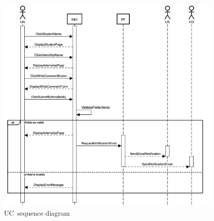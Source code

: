 \begin{figure}[h]
    \centering
    \includegraphics[width=16cm]{images/sequence-diagrams/university-comments-internship.png}
    \caption{UC\theuc\ sequence diagram}
\end{figure}

\clearpage
